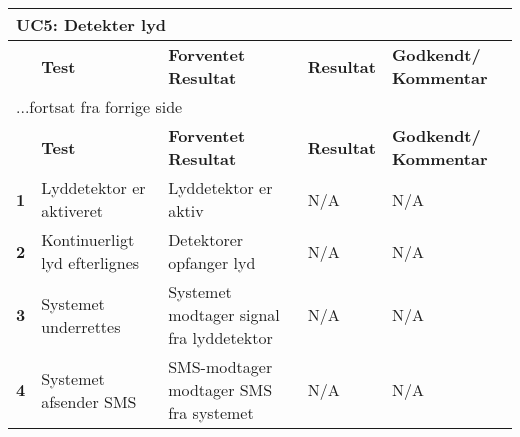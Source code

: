 
\begin{center}
\begin{longtable}{|p{}|p{}|p{}|p{}|p{}|} %
\hline
\multicolumn{5}{|l|}{\textbf{UC5: Detekter lyd}} \\ \hline
\multicolumn{1}{|c|}{} &
\textbf{Test} &
\textbf{Forventet \newline Resultat} &
\textbf{Resultat} &
\textbf{Godkendt/ \newline Kommentar} \\ \hline 
\endfirsthead

\multicolumn{5}{l}{...fortsat fra forrige side} \\ \hline 
\multicolumn{1}{|c|}{} &
\textbf{Test} &
\textbf{Forventet \newline Resultat} &
\textbf{Resultat} &
\textbf{Godkendt/ \newline Kommentar} \\ \hline 
\endhead



\textbf{1}		
&Lyddetektor er aktiveret
&Lyddetektor er aktiv	
&N/A 	
&N/A \\\hline
\textbf{2}		
&Kontinuerligt lyd efterlignes	
&Detektorer opfanger lyd
&N/A 	
&N/A \\\hline
\textbf{3}		
&Systemet underrettes	
&Systemet modtager signal fra lyddetektor 
&N/A 	
&N/A  \\\hline
\textbf{4}		
&Systemet afsender SMS
&SMS-modtager modtager SMS fra systemet
&N/A 	
&N/A \\\hline
	\end{longtable}
	\label{ATUC5} 
\end{center}

